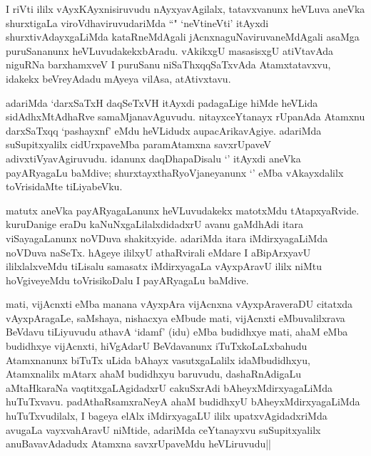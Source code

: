 
\begin{artha}
I riVti ililx vAyxKAyxnisiruvudu nAyxyavAgilalx, tatavxvanunx heVLuva aneVka shurxtigaLa viroVdhaviruvudariMda ``\stext" `neVtineVti' itAyxdi shurxtivAdayxgaLiMda kataRneMdAgali jAcnxnaguNaviruvaneMdAgali asaMga puruSananunx heVLuvudakekxbAradu. vAkikxgU masasisxgU atiVtavAda niguRNa barxhamxveV I puruSanu niSaThxqqSaTxvAda Atamxtatavxvu, idakekx beVreyAdadu mAyeya vilAsa, atAtivxtavu. 
\end{artha}

\begin{artha}
adariMda `darxSaTxH daqSeTxVH itAyxdi padagaLige hiMde heVLida sidAdhxMtAdhaRve samaMjanavAguvudu. nitayxceYtanayx rUpanAda Atamxnu darxSaTxqq `pashayxnf' eMdu heVLidudx aupacArikavAgiye. adariMda suSupitxyalilx cidUrxpaveMba paramAtamxna savxrUpaveV adivxtiVyavAgiruvudu. idanunx daqDhapaDisalu `\stext' itAyxdi aneVka payARyagaLu baMdive; shurxtayxthaRyoVjaneyanunx `\stext ' eMba vAkayxdalilx toVrisidaMte tiLiyabeVku. 
\end{artha}

\begin{artha}
matutx aneVka payARyagaLanunx heVLuvudakekx matotxMdu tAtapxyaRvide. kuruDanige eraDu kaNuNxgaLilalxdidadxrU avanu gaMdhAdi itara viSayagaLanunx noVDuva shakitxyide. adariMda itara iMdirxyagaLiMda noVDuva naSeTx. hAgeye ililxyU athaRvirali eMdare I aBipArxyavU ililxlalxveMdu tiLisalu samasatx iMdirxyagaLa vAyxpAravU ililx niMtu hoVgiveyeMdu toVrisikoDalu I payARyagaLu baMdive. 
\end{artha}

\begin{artha}
mati, vijAcnxti eMba manana vAyxpAra vijAcnxna vAyxpAraveraDU citatxda vAyxpAragaLe, saMshaya, nishacxya eMbude mati, vijAcnxti eMbuvalilxrava BeVdavu tiLiyuvudu athavA `idamf' (idu) eMba budidhxye mati, ahaM eMba budidhxye vijAcnxti, hiVgAdarU BeVdavanunx iTuTxkoLaLxbahudu Atamxnanunx biTuTx uLida bAhayx vasutxgaLalilx idaMbudidhxyu, Atamxnalilx mAtarx ahaM budidhxyu baruvudu, dashaRnAdigaLu aMtaHkaraNa vaqtitxgaLAgidadxrU cakuSxrAdi bAheyxMdirxyagaLiMda huTuTxvavu. padAthaRsamxraNeyA ahaM budidhxyU bAheyxMdirxyagaLiMda huTuTxvudilalx, I bageya elAlx iMdirxyagaLU ililx upatxvAgidadxriMda avugaLa vayxvahAravU niMtide, adariMda ceYtanayxvu suSupitxyalilx anuBavavAdadudx Atamxna savxrUpaveMdu heVLiruvudu||
\end{artha}%

